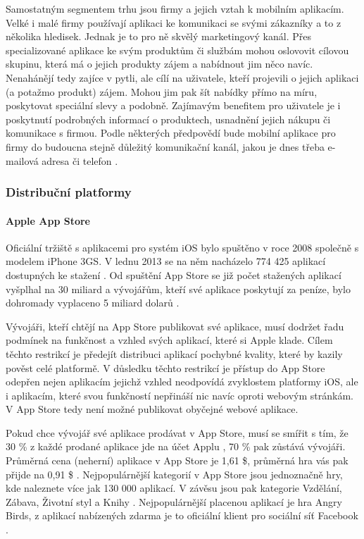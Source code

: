 Samostatným segmentem trhu jsou firmy a jejich vztah k mobilním aplikacím. Velké i malé firmy používají aplikaci ke komunikaci se svými zákazníky a to z několika hledisek. Jednak je to pro ně skvělý marketingový kanál. Přes specializované aplikace ke svým produktům či službám mohou oslovovit cílovou skupinu, která má o jejich produkty zájem a nabídnout jim něco navíc. Nenahánějí tedy zajíce v pytli, ale cílí na uživatele, kteří projevili o jejich aplikaci (a potažmo produkt) zájem. Mohou jim pak šít nabídky přímo na míru, poskytovat speciální slevy a podobně. Zajímavým benefitem pro uživatele je i poskytnutí podrobných informací o produktech, usnadnění jejich nákupu či komunikace s firmou. Podle některých předpovědí bude mobilní aplikace pro firmy do budoucna stejně důležitý komunikační kanál, jakou je dnes třeba e-mailová adresa či telefon \cite{forbes_business_checklist}.

\subsubsection{Distribuční platformy}
\paragraph{Apple App Store}
Oficiální tržiště s aplikacemi pro systém iOS bylo spuštěno v roce 2008 společně s modelem iPhone 3GS. V lednu 2013 se na něm nacházelo 774 425 aplikací dostupných ke stažení \cite{app_store_metrics}. Od spuštění App Store se již počet stažených aplikací vyšplhal na 30 miliard \cite{mobile_app_usage_statistics} a vývojářům, kteří své aplikace poskytují za peníze, bylo dohromady vyplaceno 5 miliard dolarů \cite{mobile_app_usage_statistics}.

Vývojáři, kteří chtějí na App Store publikovat své aplikace, musí dodržet řadu podmínek na funkčnost a vzhled svých aplikací, které si Apple klade. Cílem těchto restrikcí je předejít distribuci aplikací pochybné kvality, které by kazily pověst celé platformě. V důsledku těchto restrikcí je přístup do App Store odepřen nejen aplikacím jejichž vzhled neodpovídá zvyklostem platformy iOS, ale i aplikacím, které svou funkčností nepřináší nic navíc oproti webovým stránkám. V App Store tedy není možné publikovat obyčejné webové aplikace.

Pokud chce vývojář své aplikace prodávat v App Store, musí se smířit s tím, že 30 \% z každé prodané aplikace jde na účet Applu \cite{distribute_your_app_ios}, 70 \% pak zůstává vývojáři. Průměrná cena (neherní) aplikace v App Store je 1,61 \$, průměrná hra vás pak přijde na 0,91 \$ \cite{app_store_metrics}. Nejpopulárnější kategorií v App Store jsou jednoznačně hry, kde naleznete více jak 130 000 aplikací. V závěsu jsou pak kategorie Vzdělání, Zábava, Životní styl a Knihy \cite{app_store_metrics}. Nejpopulárnější placenou aplikací je hra Angry Birds, z aplikací nabízených zdarma je to oficiální klient pro sociální síť Facebook \cite{apple_names_top_apps}.

